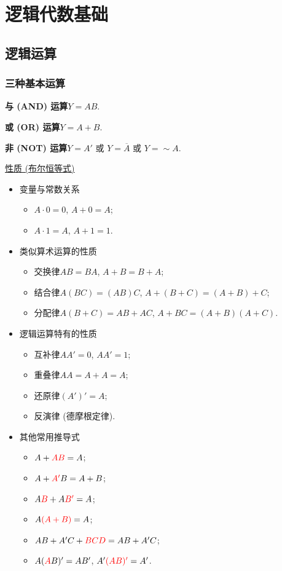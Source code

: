 \section{逻辑代数基础}
\subsection{逻辑运算}
\subsubsection{三种基本运算}
\textbf{与 (AND) 运算}\quad $Y=AB$.

\textbf{或 (OR) 运算}\quad $Y=A+B$.

\textbf{非 (NOT) 运算}\quad $Y=A'$ 或 $Y=\overline{A}$ 或 $Y=\sim A$.

\underline{性质 (布尔恒等式)}
\begin{itemize}
    \item 变量与常数关系
          \begin{itemize}
              \item $A\cdot 0=0$, $A+0=A$;
              \item $A\cdot 1=A$, $A+1=1$.
          \end{itemize}
    \item 类似算术运算的性质
          \begin{itemize}
              \item 交换律\quad $AB=BA$, $A+B=B+A$;
              \item 结合律\quad $A(BC)=(AB)C$, $A+(B+C)=(A+B)+C$;
              \item 分配律\quad $A(B+C)=AB+AC$, {\color{red} $A+BC=(A+B)(A+C)$}.
          \end{itemize}
    \item 逻辑运算特有的性质
          \begin{itemize}
              \item 互补律\quad $AA'=0$, $AA'=1$;
              \item 重叠律\quad $AA=A+A=A$;
              \item 还原律\quad $(A')'=A$;
              \item 反演律 (德摩根定律).
          \end{itemize}
    \item 其他常用推导式
          \begin{itemize}
              \item $A+{\color{red} AB}=A$;
              \item $A+{\color{red} A'}B=A+B$;
              \item $A{\color{red} B}+A{\color{red} B'}=A$;
              \item $A{\color{red} (A+B)}=A$;
              \item $AB+A'C+{\color{red} BCD}=AB+A'C$;
              \item $A({\color{red} A}B)'=AB'$, $A'{\color{red} (AB)'}=A'$.
          \end{itemize}
\end{itemize}

